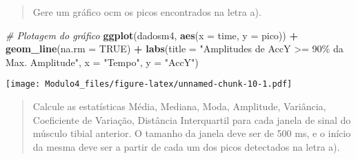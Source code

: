 \documentclass[
]{article}
\newenvironment{Shaded}{\begin{snugshade}}{\end{snugshade}}
\newcommand{\AttributeTok}[1]{\textcolor[rgb]{0.13,0.29,0.53}{#1}}
\newcommand{\CommentTok}[1]{\textcolor[rgb]{0.56,0.35,0.01}{\textit{#1}}}
\newcommand{\ConstantTok}[1]{\textcolor[rgb]{0.56,0.35,0.01}{#1}}
\newcommand{\FloatTok}[1]{\textcolor[rgb]{0.00,0.00,0.81}{#1}}
\newcommand{\FunctionTok}[1]{\textcolor[rgb]{0.13,0.29,0.53}{\textbf{#1}}}
\newcommand{\NormalTok}[1]{#1}
\newcommand{\OtherTok}[1]{\textcolor[rgb]{0.56,0.35,0.01}{#1}}
\newcommand{\SpecialCharTok}[1]{\textcolor[rgb]{0.81,0.36,0.00}{\textbf{#1}}}
\newcommand{\StringTok}[1]{\textcolor[rgb]{0.31,0.60,0.02}{#1}}
\begin{document}
\begin{Shaded}
\end{Shaded}

\begin{quote}
Gere um gráfico ocm os picos encontrados na letra a).
\end{quote}

\begin{Shaded}
\begin{Highlighting}[]
\CommentTok{\# Plotagem do gráfico}
\FunctionTok{ggplot}\NormalTok{(dadosm4, }\FunctionTok{aes}\NormalTok{(}\AttributeTok{x =}\NormalTok{ time, }\AttributeTok{y =}\NormalTok{ pico)) }\SpecialCharTok{+}
  \FunctionTok{geom\_line}\NormalTok{(}\AttributeTok{na.rm =} \ConstantTok{TRUE}\NormalTok{) }\SpecialCharTok{+}
  \FunctionTok{labs}\NormalTok{(}\AttributeTok{title =} \StringTok{"Amplitudes de AccY \textgreater{}= 90\% da Max. Amplitude"}\NormalTok{,}
       \AttributeTok{x =} \StringTok{"Tempo"}\NormalTok{,}
       \AttributeTok{y =} \StringTok{"AccY"}\NormalTok{)}
\end{Highlighting}
\end{Shaded}

\texttt{[image: Modulo4\_files/figure-latex/unnamed-chunk-10-1.pdf]}

\begin{quote}
Calcule as estatísticas Média, Mediana, Moda, Amplitude, Variância,
Coeficiente de Variação, Distância Interquartil para cada janela de
sinal do músculo tibial anterior. O tamanho da janela deve ser de 500
ms, e o início da mesma deve ser a partir de cada um dos picos
detectados na letra a).
\end{quote}
\end{document}
